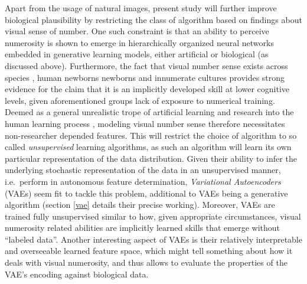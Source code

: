 \documentclass[twocolumn]{article}
\begin{document}
\indent Apart from the usage of natural images, present study will further improve biological plausibility by restricting the class of algorithm based on findings about visual sense of number. One such constraint is that an ability to perceive numerosity is shown to emerge in hierarchically organized neural networks embedded in generative learning models, either artificial or biological (as discussed above). Furthermore, the fact that visual number sense exists across species \citep{animalsnumericalcognition}, human newborns newborns \citep[chap. 1]{lakoff} and innumerate cultures \citetext{\citealp[p.~261]{dehaene2011number}; \citealp{franka2008number}} provides strong evidence for the claim that it is an implicitly developed skill at lower cognitive levels, given aforementioned groups lack of exposure to numerical training. Deemed as a general unrealistic trope of artificial learning \citep{dreyfus2007heideggerian} and research into the human learning process \citep{Zorzi2013}, modeling visual number sense therefore necessitates non-researcher depended features. This will restrict the choice of algorithm to so called \emph{unsupervised} learning algorithms, as such an algorithm will learn its own particular representation of the data distribution. Given their ability to infer the underlying stochastic representation of the data in an unsupervised manner, i.e.~perform in autonomous feature determination, \emph{Variational Autoencoders} (VAEs) seem fit to tackle this problem, additional to VAEs being a generative algorithm (section \ref{vae} details their precise working). Moreover, VAEs are trained fully unsupervised similar to how, given appropriate circumstances, visual numerosity related abilities are implicitly learned skills that emerge without ``labeled data''. Another interesting aspect of VAEs is their relatively interpretable and overseeable learned feature space, which might tell something about how it deals with visual numerosity, and thus allows to evaluate the properties of the VAE's encoding against biological data.
\end{document}
